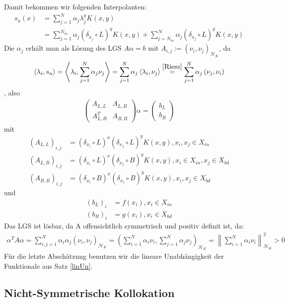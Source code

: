 Damit bekommen wir folgenden Interpolanten:
\begin{align*}
s_u(x) &= \sum_{j=1}^N \alpha_j \lambda_j^y K(x,y)\\
&= \sum_{j=1}^{N_{in}} \alpha_j (\delta_{x_j} \circ L)^y K(x,y) + \sum_{j=N_{in}}^{N} \alpha_j (\delta_{x_j} \circ L)^y K(x,y)
\end{align*}
Die $\alpha_j$ erhält man als Lösung des \ac{LGS} $A \alpha = b$ mit $A_{i,j} := (\nu_i,\nu_j)_{\mathcal{H}_K}$, da
\begin{align*}
\left<\lambda_i, s_u\right> = \left< \lambda_i, \sum_{j=1}^N \alpha_j \nu_j \right> = \sum_{j=1}^N \alpha_j \left< \lambda_i,\nu_j\right> \overset{\ref{Riesz}}{=} \sum_{j=1}^N \alpha_j \left(\nu_j, \nu_i\right)
\end{align*},
 also
\begin{align*}
\begin{pmatrix}
A_{L,L} & A_{L,B} \\ 
A_{L,B}^T & A_{B,B}
\end{pmatrix} 
\alpha =
\begin{pmatrix}
b_L \\ 
b_B
\end{pmatrix} 
\end{align*}
mit
\begin{align*}
(A_{L,L})_{i,j} &= (\delta_{x_i} \circ L)^x(\delta_{x_j} \circ L)^y K(x,y),x_i, x_j \in X_{in}\\
(A_{L,B})_{i,j} &= (\delta_{x_i} \circ L)^x(\delta_{x_j} \circ B)^y K(x,y),x_i \in X_{in}, x_j \in X_{bd} \\
(A_{B,B})_{i,j} &= (\delta_{x_i} \circ B)^x(\delta_{x_j} \circ B)^y K(x,y), x_i, x_j \in X_{bd}
\end{align*}
und
\begin{align*}
(b_L)_i &= f(x_i), x_i \in X_{in}\\
(b_B)_i &= g(x_i), x_i \in X_{bd}
\end{align*}
Das \ac{LGS} ist lösbar, da A offensichtlich symmetrisch und positiv definit ist, da:
\begin{align*}
\alpha^T A \alpha = \sum_{i,j = 1}^N \alpha_i \alpha_j (\nu_i, \nu_j)_{\mathcal{H}_K} = \left(\sum_{i=1}^N \alpha_i \nu_i, \sum_{j=1}^N \alpha_j \nu_j \right)_{\mathcal{H}_K} = \left\| \sum_{i=1}^N \alpha_i \nu_i \right\|_{\mathcal{H}_K}^2 > 0
\end{align*}
Für die letzte Abschätzung benutzen wir die lineare Unabhängigkeit der Funktionale aus Satz \ref{linUn}.
\subsection{Nicht-Symmetrische Kollokation}